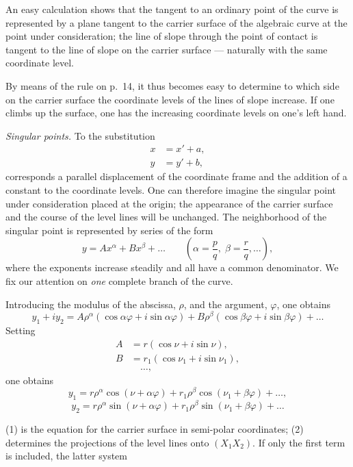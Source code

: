 \documentclass{article}
\begin{document}
An easy calculation shows that the tangent to an ordinary point of the curve is represented by a plane tangent to the carrier surface of the algebraic curve at the point under consideration; the line of slope through the point of contact is tangent to the line of slope on the carrier surface --- naturally with the same coordinate level.

By means of the rule on p.~14, it thus becomes easy to determine to which side on the carrier surface the coordinate levels of the lines of slope increase. If one climbs up the surface, one has the increasing coordinate levels on one's left hand.

\emph{Singular points.} To the substitution
\[
\begin{aligned}
x &= x' + a, \\
y &= y' + b,
\end{aligned}
\]
corresponds a parallel displacement of the coordinate frame and the addition of a constant to the coordinate levels. One can therefore imagine the singular point under consideration placed at the origin; the appearance of the carrier surface and the course of the level lines will be unchanged. The neighborhood of the singular point is represented by series of the form
\[
y = A x^\alpha + B x^\beta + \dots \qquad \left(\alpha = \frac{p}{q}, \; \beta = \frac{r}{q}, \dots\right),
\]
where the exponents increase steadily and all have a common denominator. We fix our attention on \emph{one} complete branch of the curve.

Introducing the modulus of the abscissa, $\rho$, and the argument, $\varphi$, one obtains
\[
y_1 + i y_2 = A \rho^\alpha (\cos \alpha\varphi + i \sin \alpha\varphi) + B \rho^\beta (\cos \beta\varphi + i \sin \beta\varphi) + \dots
\]
Setting
\[
\begin{aligned}
A &= r (\cos \nu + i \sin \nu), \\
B &= r_1 (\cos \nu_1 + i \sin \nu_1), \\
&\quad\dots,
\end{aligned}
\]
one obtains
\[
y_1 = r \rho^\alpha \cos (\nu + \alpha\varphi) + r_1 \rho^\beta \cos (\nu_1 + \beta\varphi) + \dots, \tag{1}
\]
\[
y_2 = r \rho^\alpha \sin (\nu + \alpha\varphi) + r_1 \rho^\beta \sin (\nu_1 + \beta\varphi) + \dots \tag{2}
\]

(1) is the equation for the carrier surface in semi-polar coordinates; (2) determines the projections of the level lines onto $(X_1 X_2)$. If only the first term is included, the latter system
\end{document}
